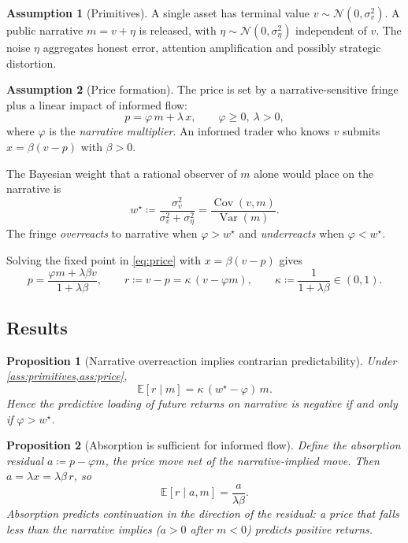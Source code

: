 \documentclass[11pt,a4paper]{article}
\theoremstyle{plain}
\newtheorem{proposition}{Proposition}
\theoremstyle{definition}
\newtheorem{assumption}{Assumption}
\theoremstyle{remark}
\newcommand{\E}{\mathbb{E}}
\newcommand{\N}{\mathcal{N}}
\DeclareMathOperator{\Var}{Var}
\DeclareMathOperator{\Cov}{Cov}
\begin{document}
\begin{assumption}[Primitives]\label{ass:primitives}
A single asset has terminal value $v\sim\N(0,\sigma_v^2)$. A public narrative $m = v + \eta$ is released, with $\eta\sim\N(0,\sigma_\eta^2)$ independent of $v$. The noise $\eta$ aggregates honest error, attention amplification and possibly strategic distortion.
\end{assumption}

\begin{assumption}[Price formation]\label{ass:price}
The price is set by a narrative-sensitive fringe plus a linear impact of informed flow:
\begin{equation}
  p = \varphi\, m + \lambda\, x, \qquad \varphi \ge 0,\ \lambda>0, \label{eq:price}
\end{equation}
where $\varphi$ is the \emph{narrative multiplier}. An informed trader who knows $v$ submits $x=\beta(v-p)$ with $\beta>0$.
\end{assumption}

The Bayesian weight that a rational observer of $m$ alone would place on the narrative is
\begin{equation}
  w^\star \coloneqq \frac{\sigma_v^2}{\sigma_v^2+\sigma_\eta^2} = \frac{\Cov(v,m)}{\Var(m)}. \label{eq:wstar}
\end{equation}
The fringe \emph{overreacts} to narrative when $\varphi>w^\star$ and \emph{underreacts} when $\varphi<w^\star$.

Solving the fixed point in \eqref{eq:price} with $x=\beta(v-p)$ gives
\begin{equation}
  p = \frac{\varphi m + \lambda\beta v}{1+\lambda\beta}, \qquad
  r \coloneqq v-p = \kappa\,(v-\varphi m), \qquad \kappa\coloneqq\frac{1}{1+\lambda\beta}\in(0,1). \label{eq:return}
\end{equation}

\subsection{Results}

\begin{proposition}[Narrative overreaction implies contrarian predictability]\label{prop:contrarian}
Under \cref{ass:primitives,ass:price},
\[
  \E[r\mid m] = \kappa\,(w^\star-\varphi)\,m .
\]
Hence the predictive loading of future returns on narrative is negative if and only if $\varphi>w^\star$.
\end{proposition}

\begin{proposition}[Absorption is sufficient for informed flow]\label{prop:absorption}
Define the absorption residual $a\coloneqq p-\varphi m$, the price move net of the narrative-implied move. Then $a=\lambda x=\lambda\beta\, r$, so
\[
  \E[r\mid a, m] = \frac{a}{\lambda\beta}.
\]
Absorption predicts continuation in the direction of the residual: a price that falls \emph{less} than the narrative implies ($a>0$ after $m<0$) predicts positive returns.
\end{proposition}
\end{document}
